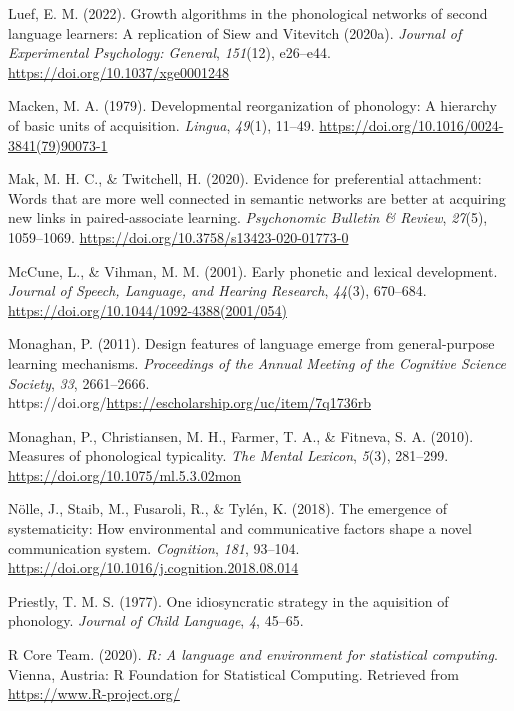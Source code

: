 \documentclass[
  man]{apa6}
\newlength{\cslhangindent}
\newenvironment{CSLReferences}[2] %
 {\begin{list}{}{%
  \setlength{\itemindent}{0pt}
  \setlength{\leftmargin}{0pt}
  \setlength{\parsep}{0pt}
  \ifodd #1
   \setlength{\leftmargin}{\cslhangindent}
   \setlength{\itemindent}{-1\cslhangindent}
  \fi
  \setlength{\itemsep}{#2\baselineskip}}}
 {\end{list}}
\begin{document}
\begin{CSLReferences}{1}{0}
Luef, E. M. (2022). Growth algorithms in the phonological networks of second language learners: {A} replication of {Siew} and {Vitevitch} (2020a). \emph{Journal of Experimental Psychology: General}, \emph{151}(12), e26--e44. \url{https://doi.org/10.1037/xge0001248}

Macken, M. A. (1979). Developmental reorganization of phonology: {A} hierarchy of basic units of acquisition. \emph{Lingua}, \emph{49}(1), 11--49. \url{https://doi.org/10.1016/0024-3841(79)90073-1}

Mak, M. H. C., \& Twitchell, H. (2020). Evidence for preferential attachment: Words that are more well connected in semantic networks are better at acquiring new links in paired-associate learning. \emph{Psychonomic Bulletin \& Review}, \emph{27}(5), 1059--1069. \url{https://doi.org/10.3758/s13423-020-01773-0}

McCune, L., \& Vihman, M. M. (2001). Early phonetic and lexical development. \emph{Journal of Speech, Language, and Hearing Research}, \emph{44}(3), 670--684. \url{https://doi.org/10.1044/1092-4388(2001/054)}

Monaghan, P. (2011). Design features of language emerge from general-purpose learning mechanisms. \emph{Proceedings of the Annual Meeting of the Cognitive Science Society}, \emph{33}, 2661--2666. https://doi.org/\url{https://escholarship.org/uc/item/7q1736rb}

Monaghan, P., Christiansen, M. H., Farmer, T. A., \& Fitneva, S. A. (2010). Measures of phonological typicality. \emph{The Mental Lexicon}, \emph{5}(3), 281--299. \url{https://doi.org/10.1075/ml.5.3.02mon}

Nölle, J., Staib, M., Fusaroli, R., \& Tylén, K. (2018). The emergence of systematicity: {How} environmental and communicative factors shape a novel communication system. \emph{Cognition}, \emph{181}, 93--104. \url{https://doi.org/10.1016/j.cognition.2018.08.014}

Priestly, T. M. S. (1977). One idiosyncratic strategy in the aquisition of phonology. \emph{Journal of Child Language}, \emph{4}, 45--65.

R Core Team. (2020). \emph{R: A language and environment for statistical computing}. Vienna, Austria: R Foundation for Statistical Computing. Retrieved from \url{https://www.R-project.org/}


\end{CSLReferences}
\end{document}
